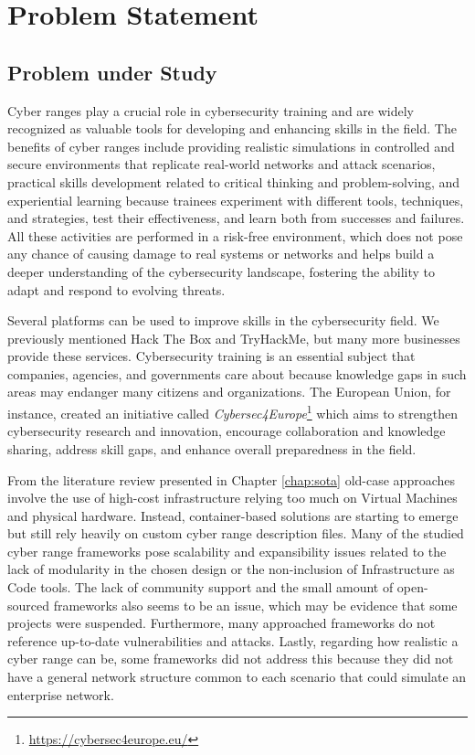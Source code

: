 \chapter{Problem Statement}\label{chap:problem_statement}

\minitoc

\section{Problem under Study} \label{sec:research_problem}

Cyber ranges play a crucial role in cybersecurity training and are widely recognized as valuable tools for developing and enhancing skills in the field. The benefits of cyber ranges include providing realistic simulations in controlled and secure environments that replicate real-world networks and attack scenarios, practical skills development related to critical thinking and problem-solving, and experiential learning because trainees experiment with different tools, techniques, and strategies, test their effectiveness, and learn both from successes and failures. All these activities are performed in a risk-free environment, which does not pose any chance of causing damage to real systems or networks and helps build a deeper understanding of the cybersecurity landscape, fostering the ability to adapt and respond to evolving threats. 

Several platforms can be used to improve skills in the cybersecurity field. We previously mentioned Hack The Box and TryHackMe, but many more businesses provide these services. Cybersecurity training is an essential subject that companies, agencies, and governments care about because knowledge gaps in such areas may endanger many citizens and organizations. The European Union, for instance, created an initiative called \textit{Cybersec4Europe}\footnote{\url{https://cybersec4europe.eu/}} which aims to strengthen cybersecurity research and innovation, encourage collaboration and knowledge sharing, address skill gaps, and enhance overall preparedness in the field. 

From the literature review presented in Chapter \ref{chap:sota} old-case approaches involve the use of high-cost infrastructure relying too much on Virtual Machines and physical hardware. Instead, container-based solutions are starting to emerge but still rely heavily on custom cyber range description files. Many of the studied cyber range frameworks pose scalability and expansibility issues related to the lack of modularity in the chosen design or the non-inclusion of Infrastructure as Code tools. The lack of community support and the small amount of open-sourced frameworks also seems to be an issue, which may be evidence that some projects were suspended. Furthermore, many approached frameworks do not reference up-to-date vulnerabilities and attacks. Lastly, regarding how realistic a cyber range can be, some frameworks did not address this because they did not have a general network structure common to each scenario that could simulate an enterprise network. 

